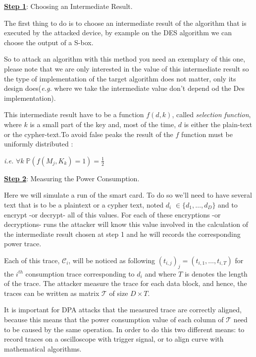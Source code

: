 \underline{\textbf{Step 1}}: Choosing an Intermediate Result.

The first thing to do is to choose an intermediate result of the algorithm that is executed by
the attacked device, by example on the DES algorithm we can choose the output of a S-box.

So to attack an algorithm with this method you need an exemplary of this one, 
please note that we are only
interested in the value of this intermediate result so the type of 
implementation of the target algorithm
does not matter, only its design does(\textit{e.g.} where we take the intermediate value don't depend 
od the Des implementation).

This intermediate result have to be a function $f(d,k)$, called \textit{selection function},
where $k$ is a small part of the key and, most of the time, $d$ is either the plain-text
 or the cypher-text.To avoid false peaks the result of the $ f $ function must be uniformly distributed : 
\begin{center}
\textit{i.e.}  $\forall k\; \mathbb{P}(f(M_j, K_k)=1) = \frac{1}{2}$
\end{center}
 \vspace{3mm}
 
\underline{\textbf{Step 2}}: Measuring the Power Consumption.

Here we will simulate a run of the smart card.
To do so we'll need to have several text that is to be a plaintext or a cypher text,
noted $d_i$ $ \in\{ d_1, \ldots,d_D \}$ and to encrypt -or decrypt- all of this values.
For each of these encryptions -or decryptions- runs the attacker will know this value involved in the
calculation of the intermediate result chosen at step 1 and he will records the corresponding power trace.

Each of this trace, $\mathcal{C}_i$, will be noticed as following $(t_{i,j})_j=( t_{i,1}, \ldots , t_{i,T})$
for the $i^{th}$  consumption trace corresponding to $d_i$ and where $T$ is denotes the length of the trace.
The attacker measure the trace for each data block, and hence, the traces can be written as
matrix $\mathcal{T}$ of size $D \times T$.
 
It is important for DPA attacks that the measured trace are correctly aligned, because this means that
the power consumption value of each column of $\mathcal{T}$ need to be caused by the same operation. 
In order to do this two different means: to record traces on a oscilloscope with trigger signal, 
or to align curve with mathematical algorithms.


